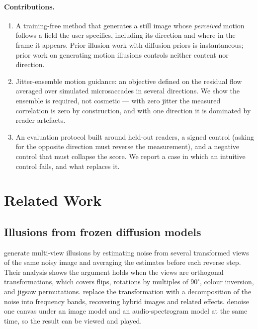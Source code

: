 \paragraph{Contributions.}
\begin{enumerate}\itemsep2pt
\item A training-free method that generates a still image whose \emph{perceived}
      motion follows a field the user specifies, including its direction and
      where in the frame it appears. Prior illusion work with diffusion priors
      is instantaneous; prior work on generating motion illusions
      \cite{sinapayen2021eigen} controls neither content nor direction.
\item Jitter-ensemble motion guidance: an objective defined on the residual
      flow averaged over simulated microsaccades in several directions. We show
      the ensemble is required, not cosmetic --- with zero jitter the measured
      correlation is zero by construction, and with one direction it is
      dominated by reader artefacts.
\item An evaluation protocol built around held-out readers, a signed control
      (asking for the opposite direction must reverse the measurement), and a
      negative control that must collapse the score. We report a case in which
      an intuitive control fails, and what replaces it.
\end{enumerate}

\section{Related Work}

\subsection{Illusions from frozen diffusion models}

\citet{geng2024anagrams} generate multi-view illusions by estimating noise from
several transformed views of the same noisy image and averaging the estimates
before each reverse step. Their analysis shows the argument holds when the
views are orthogonal transformations, which covers flips, rotations by
multiples of $90^\circ$, colour inversion, and jigsaw permutations.
\citet{geng2024factorized} replace the transformation with a decomposition of
the noise into frequency bands, recovering hybrid images
\cite{oliva2006hybrid} and related effects. \citet{chen2024imagesthatsound}
denoise one canvas under an image model and an audio-spectrogram model at the
same time, so the result can be viewed and played.

